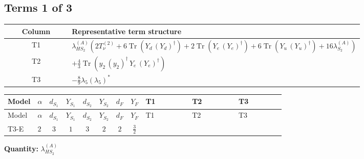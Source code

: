 \documentclass[8pt]{article}
\begin{document}
\begin{landscape}
\subsection*{Terms 1 of 3}
\begin{center}
\begin{tabular}{@{}c >{\raggedright\arraybackslash}p{0.82\linewidth}@{}}
\toprule
Column & Representative term structure \\
\midrule
T1 & \(\displaystyle {\lambda_{HS_2}^{(A)}} (2 T_{\nu}^{(2)}+6 \operatorname{Tr}\!\left({Y_d}\,\left({Y_d}\right)^{\dagger}\right)+2 \operatorname{Tr}\!\left({Y_e}\,\left({Y_e}\right)^{\dagger}\right)+6 \operatorname{Tr}\!\left({Y_u}\,\left({Y_u}\right)^{\dagger}\right)+16 {\lambda_{S_2}^{(A)}})\) \\
\midrule
T2 & \(\displaystyle +\frac{4}{3} \operatorname{Tr}\!\left({y_2}\,\left({y_2}\right)^{\dagger}\,{Y_e}\,\left({Y_e}\right)^{\dagger}\right)\) \\
\midrule
T3 & \(\displaystyle -\frac{8}{9} {\lambda_5} \left({\lambda_5}\right)^{*}\) \\
\midrule
\bottomrule
\end{tabular}
\end{center}
\smallskip
\tiny
\begin{longtable}{@{}llcccccc >{\raggedright\arraybackslash}p{0.21\linewidth} >{\raggedright\arraybackslash}p{0.21\linewidth} >{\raggedright\arraybackslash}p{0.21\linewidth}@{}}
\toprule
Model & $\alpha$ & $d_{S_1}$ & $Y_{S_1}$ & $d_{S_2}$ & $Y_{S_2}$ & $d_F$ & $Y_F$ & T1 & T2 & T3 \\
\midrule
\endfirsthead
\toprule
Model & $\alpha$ & $d_{S_1}$ & $Y_{S_1}$ & $d_{S_2}$ & $Y_{S_2}$ & $d_F$ & $Y_F$ & T1 & T2 & T3 \\
\midrule
\endhead
T3-E & $2$ & $3$ & $1$ & $3$ & $2$ & $2$ & $\frac{3}{2}$ & \scriptsize\adjustbox{max width=\linewidth}{$\begin{gathered} {\lambda_{HS_2}^{(A)}} (2 T_{\nu}^{(2)}+6 \operatorname{Tr}\!\left({Y_d}\,\left({Y_d}\right)^{\dagger}\right)+2 \operatorname{Tr}\!\left({Y_e}\,\left({Y_e}\right)^{\dagger}\right)+6 \operatorname{Tr}\!\left({Y_u}\,\left({Y_u}\right)^{\dagger}\right)+16 {\lambda_{S_2}^{(A)}})\end{gathered}$} & \scriptsize\adjustbox{max width=\linewidth}{$\begin{gathered} +\frac{4}{3} \operatorname{Tr}\!\left({y_2}\,\left({y_2}\right)^{\dagger}\,{Y_e}\,\left({Y_e}\right)^{\dagger}\right)\end{gathered}$} & \scriptsize\adjustbox{max width=\linewidth}{$\begin{gathered} -\frac{8}{9} {\lambda_5} \left({\lambda_5}\right)^{*}\end{gathered}$} \\
\midrule
\bottomrule
\end{longtable}
\clearpage
\noindent\textbf{Quantity: }$\lambda_{HS_2}^{(A)}$\par\smallskip

\end{landscape}
\end{document}
